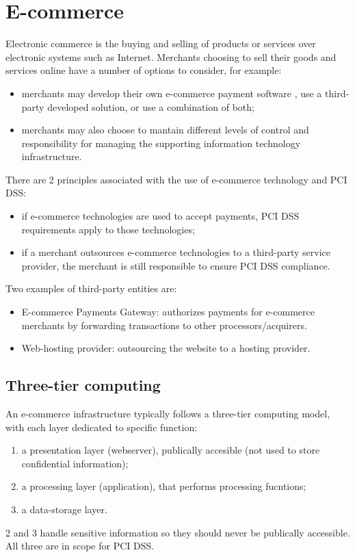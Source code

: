 \documentclass[a4paper, 10pt, titlepage]{article}
\begin{document}
\section{E-commerce}
Electronic commerce is the buying and selling of products or services over electronic systems such as Internet. Merchants choosing to sell their goods and services online have a number of options to consider, for example:
\begin{itemize}
\item merchants may develop their own e-commerce payment software , use a third-party developed solution, or use a combination of both;
\item merchants may also choose to mantain different levels of control and responsibility for managing the supporting information technology infrastructure.
\end{itemize}
There are 2 principles associated with the use of e-commerce technology and PCI DSS:
\begin{itemize}
\item if e-commerce technologies are used to accept payments, PCI DSS requirements apply to those technologies;
\item if a merchant outsources e-commerce technologies to a third-party service provider, the merchant is still responsible to ensure PCI DSS compliance.
\end{itemize}
Two examples of third-party entities are:
\begin{itemize}
\item E-commerce Payments Gateway: authorizes payments for e-commerce merchants by forwarding transactions to other processors/acquirers.
\item Web-hosting provider: outsourcing the website to a hosting provider.
\end{itemize}

\subsection{Three-tier computing}
An e-commerce infrastructure typically follows a three-tier computing model, with each layer dedicated to specific function:
\begin{enumerate}
\item a presentation layer (webserver), publically accesible (not used to store confidential information);
\item a processing layer (application), that performs processing fucntions;
\item a data-storage layer.
\end{enumerate}
2 and 3 handle sensitive information so they should never be publically accessible. All three are in scope for PCI DSS.\medskip\\
\end{document}
